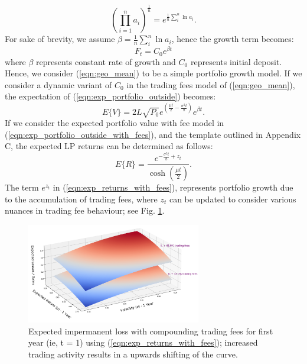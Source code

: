 \documentclass[journal,twocolumn,12pt]{ieeesyscoin}
\begin{document}
\begin{equation}\label{eqn:geo_mean}
  (\prod_{i=1}^{n}a_{i})^{\frac{1}{n}} = e^{\frac{1}{n}\sum_{i}^{n}\ln a_{i}}.
\end{equation}
For sake of brevity, we assume $\beta = \frac{1}{n}\sum_{i}^{n}\ln a_{i}$, hence the growth term becomes:
\begin{equation}\label{eqn:geo_mean}
  F_{t} = C_{0} e^{\beta t}
\end{equation}
where $\beta$ represents constant rate of growth and $C_{0}$ represents initial deposit. Hence, we consider (\ref{eqn:geo_mean}) to be a simple portfolio growth model. If we consider a dynamic variant of $C_{0}$ in the trading fees model of (\ref{eqn:geo_mean}), the expectation of (\ref{eqn:exp_portfolio_outside}) becomes:
\begin{equation}\label{eqn:exp_portfolio_outside_with_fees}
  E\{V\} = 2 L \sqrt{P_{0}}  e^{(\frac{\mu t}{2} - \frac{\sigma^2 t}{8})}e^{ \beta t}.
\end{equation}
If we consider the expected portfolio value with fee model in (\ref{eqn:exp_portfolio_outside_with_fees}), and the template outlined in Appendix C, the expected LP returns can be determined as follows:  
\begin{equation}\label{eqn:exp_returns_with_fees}
  E\{R\} = \frac{e^{-\frac{\sigma^2 t}{8} + z_{t}}}{\cosh (\frac{\mu t}{2})}.
\end{equation}
The term $e^{z_{t}}$ in (\ref{eqn:exp_returns_with_fees}), represents portfolio growth due to the accumulation of trading fees, where $z_{t}$ can be updated to consider various nuances in trading fee behaviour; see Fig. \ref{fig:imp_loss_compounding_fees}.

\begin{figure}[h!]
\includegraphics[width=3in]{img/imp_loss_compounding_fees.png}
\caption{Expected impermanent loss with compounding trading fees for first year (ie, t = 1)  using (\ref{eqn:exp_returns_with_fees}); increased trading activity results in a upwards shifting of the curve.}
\label{fig:imp_loss_compounding_fees}
\end{figure}
\end{document}
